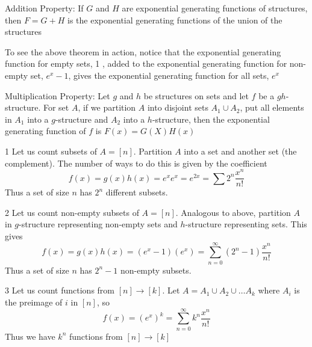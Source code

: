 \begin{theorem}
    Addition Property: If $G$ and $H$ are exponential generating functions of structures, then $F=G+H$ is the exponential generating functions of the union of the structures
\end{theorem}

To see the above theorem in action, notice that the exponential generating function for empty sets, 1 , added to the exponential generating function for non-empty set, $e^{x}-1$, gives the exponential generating function for all sets, $e^{x}$

\begin{theorem}
    Multiplication Property: Let $g$ and $h$ be structures on sets and let $f$ be a $gh$-structure. For set $A$, if we partition $A$ into disjoint sets $A_{1} \cup A_{2}$, put all elements in $A_{1}$ into a $g$-structure and $A_{2}$ into a $h$-structure, then the exponential generating function of $f$ is $F(x)=G(X) H(x)$
\end{theorem}

\begin{example}1
    Let us count subsets of $A=[n]$. Partition $A$ into a set and another set (the complement). The number of ways to do this is given by the coefficient
\[
    f(x)=g(x) h(x)=e^{x} e^{x}=e^{2 x}=\sum 2^{n} \frac{x^{n}}{n !}
\]
Thus a set of size $n$ has $2^{n}$ different subsets.
\end{example}

\begin{example}2
    Let us count non-empty subsets of $A=[n]$. Analogous to above, partition $A$ in $g$-structure representing non-empty sets and $h$-structure representing sets. This gives
\[
    f(x)=g(x) h(x)=\left(e^{x}-1\right)\left(e^{x}\right)=\sum_{n=0}^{\infty}\left(2^{n}-1\right) \frac{x^{n}}{n !}
\]
Thus a set of size $n$ has $2^{n}-1$ non-empty subsets.
\end{example}

\begin{example}3
    Let us count functions from $[n] \rightarrow[k]$. Let $A=A_{1} \cup A_{2} \cup \ldots A_{k}$ where $A_{i}$ is the preimage of $i$ in $[n]$, so
\[
f(x)=\left(e^{x}\right)^{k}=\sum_{n=0}^{\infty} k^{n} \frac{x^{n}}{n !}
\]
Thus we have $k^{n}$ functions from $[n] \rightarrow[k]$
\end{example}

